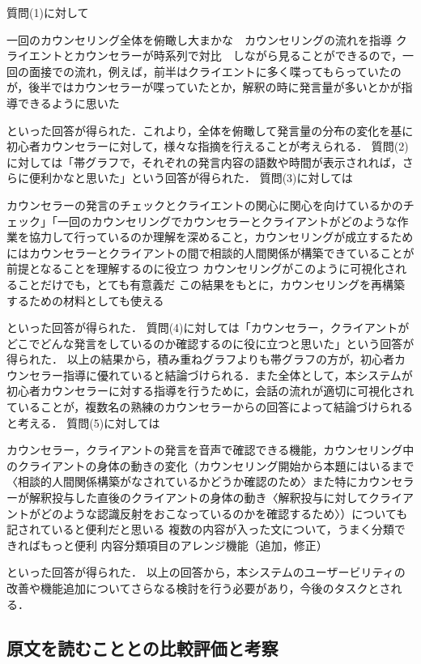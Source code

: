 \documentclass[shuuron]{kuee}
\begin{document}
質問(1)に対して

  一回のカウンセリング全体を俯瞰し大まかな　カウンセリングの流れを指導
  クライエントとカウンセラーが時系列で対比　しながら見ることができるので，一回の面接での流れ，例えば，前半はクライエントに多く喋ってもらっていたのが，後半ではカウンセラーが喋っていたとか，解釈の時に発言量が多いとかが指導できるように思いた

といった回答が得られた．これより，全体を俯瞰して発言量の分布の変化を基に初心者カウンセラーに対して，様々な指摘を行えることが考えられる．
質問(2)に対しては「帯グラフで，それぞれの発言内容の語数や時間が表示されれば，さらに便利かなと思いた」という回答が得られた．
質問(3)に対しては

  カウンセラーの発言のチェックとクライエントの関心に関心を向けているかのチェック」「一回のカウンセリングでカウンセラーとクライアントがどのような作業を協力して行っているのか理解を深めること，カウンセリングが成立するためにはカウンセラーとクライアントの間で相談的人間関係が構築できていることが前提となることを理解するのに役立つ
  カウンセリングがこのように可視化されることだけでも，とても有意義だ
  この結果をもとに，カウンセリングを再構築するための材料としても使える

といった回答が得られた．
質問(4)に対しては「カウンセラー，クライアントがどこでどんな発言をしているのか確認するのに役に立つと思いた」という回答が得られた．
以上の結果から，積み重ねグラフよりも帯グラフの方が，初心者カウンセラー指導に優れていると結論づけられる．また全体として，本システムが初心者カウンセラーに対する指導を行うために，会話の流れが適切に可視化されていることが，複数名の熟練のカウンセラーからの回答によって結論づけられると考える．
質問(5)に対しては

  カウンセラー，クライアントの発言を音声で確認できる機能，カウンセリング中のクライアントの身体の動きの変化（カウンセリング開始から本題にはいるまで〈相談的人間関係構築がなされているかどうか確認のため〉また特にカウンセラーが解釈投与した直後のクライアントの身体の動き〈解釈投与に対してクライアントがどのような認識反射をおこなっているのかを確認するため〉）についても記されていると便利だと思いる
  複数の内容が入った文について，うまく分類できればもっと便利
  内容分類項目のアレンジ機能（追加，修正）



といった回答が得られた．
以上の回答から，本システムのユーザービリティの　改善や機能追加についてさらなる検討を行う必要があり，今後のタスクとされる．

\subsection{原文を読むこととの比較評価と考察}%
\end{document}
